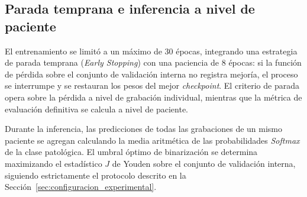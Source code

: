 \subsection{Parada temprana e inferencia a nivel de paciente}

El entrenamiento se limitó a un máximo de 30 épocas, integrando una estrategia de parada temprana (\textit{Early Stopping}) con una paciencia de 8 épocas: si la función de pérdida sobre el conjunto de validación interna no registra mejoría, el proceso se interrumpe y se restauran los pesos del mejor \textit{checkpoint}. El criterio de parada opera sobre la pérdida a nivel de grabación individual, mientras que la métrica de evaluación definitiva se calcula a nivel de paciente.

Durante la inferencia, las predicciones de todas las grabaciones de un mismo paciente se agregan calculando la media aritmética de las probabilidades \textit{Softmax} de la clase patológica. El umbral óptimo de binarización se determina maximizando el estadístico $J$ de Youden sobre el conjunto de validación interna, siguiendo estrictamente el protocolo descrito en la Sección~\ref{sec:configuracion_experimental}.